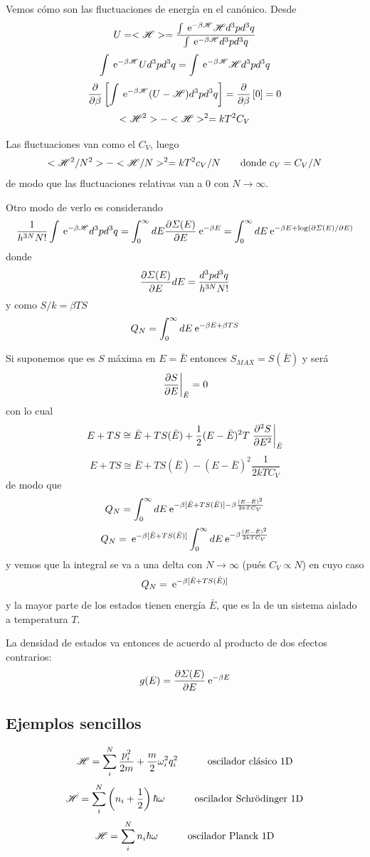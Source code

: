 \documentclass[10pt,oneside]{CBFT_book}
\begin{document}
Vemos cómo son las fluctuaciones de energía en el canónico. Desde 
\[
	U = <\Ham> = \frac{\int \euler^{-\beta\Ham} \Ham d^3p d^3q}{\int \euler^{-\beta\Ham} d^3p d^3q}
\]
\[
	\int \euler^{-\beta\Ham} U d^3p d^3q = \int \euler^{-\beta\Ham} \Ham d^3p d^3q
\]
\[
	\dpar{}{\beta}\left[ \int \euler^{-\beta\Ham} (U-\Ham) d^3p d^3q\right] = \dpar{}{\beta}\left[ 0 \right] = 0
\]
\[
	<\Ham^2> - <\Ham>^2 = kT^2C_V
\]

Las fluctuaciones van como el $C_V$, luego 
\[
	<\Ham^2/N^2> - <\Ham/N>^2 = kT^2c_V/N \qquad \text{donde } c_V = C_V/N
\]
de modo que las fluctuaciones relativas van a 0 con $N\to\infty$.

Otro modo de verlo es considerando 
\[
	\frac{1}{h^{3N}N!}\int \euler^{-\beta\Ham} d^3p d^3q = \int_0^\infty dE \dpar{\Sigma(E)}{E} \euler^{-\beta E} =
	\int_0^\infty dE \euler^{-\beta E + \log (\partial \Sigma(E)/\partial E)}
\]
donde 
\[
	\dpar{\Sigma(E)}{E} dE = \frac{d^3p d^3q}{h^{3N}N!}
\]
y como $S/k = \beta TS$
\[
	Q_N = \int_0^\infty dE \euler^{-\beta E + \beta T S }
\]

Si suponemos que es $S$ máxima en $E=\bar{E}$ entonces $S_{MAX} = S(\bar{E})$ y será 
\[
	\left. \dpar{S}{E} \right|_{\bar{E}} = 0
\]
con lo cual
\[
	E + TS \cong \bar{E} + TS(\bar{E}) + \frac{1}{2}(E-\bar{E})^2 T \left. \dpar[2]{S}{E} \right|_{\bar{E}}
\]
\[
	E + TS \cong \bar{E} + TS(\bar{E}) - (E-\bar{E})^2 \frac{1}{2kTC_V}
\]
de modo que 
\[
	Q_N = \int_0^\infty dE \euler^{-\beta [\bar{E} + TS(\bar{E})] - \beta \frac{(E-\bar{E})^2}{2kTC_V}}
\]
\[
	Q_N = \euler^{-\beta [\bar{E} + TS(\bar{E})]} \int_0^\infty dE \euler^{- \beta \frac{(E-\bar{E})^2}{2kTC_V}}
\]
y vemos que la integral se va a una delta con $N\to \infty$ (pués $C_V \propto N$) en cuyo caso
\[
	Q_N = \euler^{-\beta [\bar{E} + TS(\bar{E})]} 
\]
y la mayor parte de los estados tienen energía $\bar{E}$, que es la de un sistema aislado a temperatura $T$.

La densidad de estados va entonces de acuerdo al producto de dos efectos contrarios:
\[
	g(E) = \dpar{\Sigma(E)}{E}\euler^{-\beta E}
\]

\subsection{Ejemplos sencillos}

\[
	\Ham = \sum_i^N \frac{p_i^2}{2m} + \frac{m}{2}\omega_i^2 q_i^2 \quad \qquad \text{oscilador clásico 1D}
\]
\[
	\Ham = \sum_i^N \left( n_i + \frac{1}{2} \right)\hbar\omega  \quad \qquad \text{oscilador Schrödinger 1D}
\]
\[
	\Ham = \sum_i^N  n_i \hbar\omega \quad \qquad \text{oscilador Planck 1D}
\]
\end{document}
